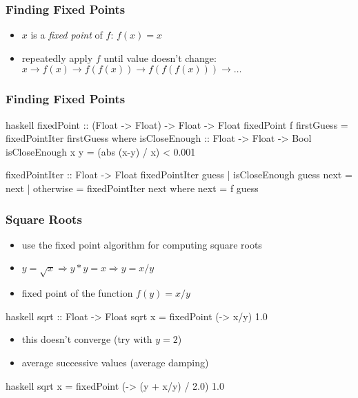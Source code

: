 \documentclass[dvipsnames]{beamer}
\theoremstyle{plain}
\begin{document}
\begin{frame}
  \frametitle{Finding Fixed Points}

  \begin{itemize}
    \item $x$ is a \emph{fixed point} of $f$: $f(x)=x$
    \item repeatedly apply $f$ until value doesn't change:\\
      $x \rightarrow f(x) \rightarrow f(f(x)) \rightarrow f(f(f(x)))
      \rightarrow \ldots$
  \end{itemize}
\end{frame}

\begin{frame}[fragile]
  \frametitle{Finding Fixed Points}

  \begin{exampleblock}{}
    \begin{pygments}{haskell}
fixedPoint :: (Float -> Float) -> Float -> Float
fixedPoint f firstGuess = fixedPointIter firstGuess
  where
    isCloseEnough :: Float -> Float -> Bool
    isCloseEnough x y = (abs (x-y) / x) < 0.001

    fixedPointIter :: Float -> Float
    fixedPointIter guess
      | isCloseEnough guess next = next
      | otherwise                = fixedPointIter next
      where next = f guess
    \end{pygments}
  \end{exampleblock}
\end{frame}

\begin{frame}[fragile]
  \frametitle{Square Roots}

  \begin{itemize}
    \item use the fixed point algorithm for computing square roots
    \item $y = \sqrt{x} \Rightarrow y * y = x \Rightarrow y = x / y$
    \item fixed point of the function $f(y) = x / y$
  \end{itemize}

  \begin{exampleblock}{}
    \begin{pygments}{haskell}
sqrt :: Float -> Float
sqrt x = fixedPoint (\y -> x/y) 1.0
    \end{pygments}
  \end{exampleblock}

  \pause
  \begin{itemize}
    \item this doesn't converge (try with $y=2$)
    \item average successive values (average damping)
  \end{itemize}

  \begin{exampleblock}{}
    \begin{pygments}{haskell}
sqrt x = fixedPoint (\y -> (y + x/y) / 2.0) 1.0
    \end{pygments}
  \end{exampleblock}
\end{frame}
\end{document}
